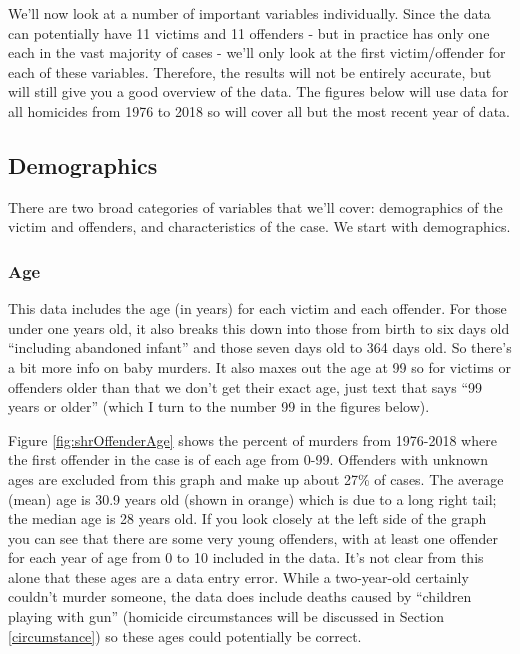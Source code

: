 \documentclass[
  12pt,
  openany]{book}
\begin{document}
We'll now look at a number of important variables individually. Since the data can potentially have 11 victims and 11 offenders - but in practice has only one each in the vast majority of cases - we'll only look at the first victim/offender for each of these variables. Therefore, the results will not be entirely accurate, but will still give you a good overview of the data. The figures below will use data for all homicides from 1976 to 2018 so will cover all but the most recent year of data.

\hypertarget{demographics}{%
\subsection{Demographics}\label{demographics}}

There are two broad categories of variables that we'll cover: demographics of the victim and offenders, and characteristics of the case. We start with demographics.

\hypertarget{age-1}{%
\subsubsection{Age}\label{age-1}}

This data includes the age (in years) for each victim and each offender. For those under one years old, it also breaks this down into those from birth to six days old ``including abandoned infant'' and those seven days old to 364 days old. So there's a bit more info on baby murders. It also maxes out the age at 99 so for victims or offenders older than that we don't get their exact age, just text that says ``99 years or older'' (which I turn to the number 99 in the figures below).

Figure \ref{fig:shrOffenderAge} shows the percent of murders from 1976-2018 where the first offender in the case is of each age from 0-99. Offenders with unknown ages are excluded from this graph and make up about 27\% of cases. The average (mean) age is 30.9 years old (shown in orange) which is due to a long right tail; the median age is 28 years old. If you look closely at the left side of the graph you can see that there are some very young offenders, with at least one offender for each year of age from 0 to 10 included in the data. It's not clear from this alone that these ages are a data entry error. While a two-year-old certainly couldn't murder someone, the data does include deaths caused by ``children playing with gun'' (homicide circumstances will be discussed in Section \ref{circumstance}) so these ages could potentially be correct.
\end{document}
